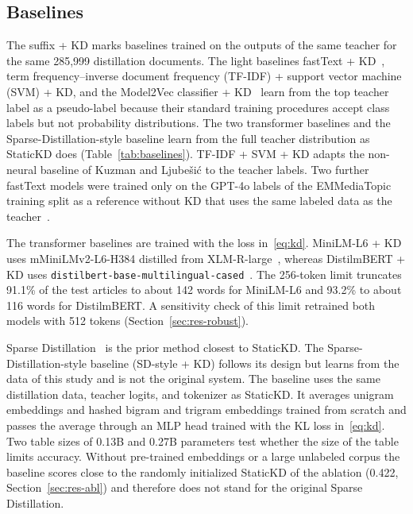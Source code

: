 \documentclass{ieeeaccess}
\begin{document}
\subsection{Baselines}
\label{sec:baselines}
The suffix + KD marks baselines trained on the outputs of the same teacher for the same 285,999 distillation documents. The light baselines fastText + KD~\cite{joulin2017bag}, term frequency--inverse document frequency (TF-IDF) + support vector machine (SVM) + KD, and the Model2Vec classifier + KD~\cite{tulkens2024model2vec} learn from the top teacher label as a pseudo-label because their standard training procedures accept class labels but not probability distributions. The two transformer baselines and the Sparse-Distillation-style baseline learn from the full teacher distribution as StaticKD does (Table~\ref{tab:baselines}). TF-IDF + SVM + KD adapts the non-neural baseline of Kuzman and Ljube\v{s}i\'c to the teacher labels. Two further fastText models were trained only on the GPT-4o labels of the EMMediaTopic training split as a reference without KD that uses the same labeled data as the teacher~\cite{kuzman2025llm}.

The transformer baselines are trained with the loss in~\eqref{eq:kd}. MiniLM-L6 + KD uses mMiniLMv2-L6-H384 distilled from XLM-R-large~\cite{wang2021minilmv2}, whereas DistilmBERT + KD uses \texttt{distilbert-base-multilingual-cased}~\cite{sanh2019distilbert}. The 256-token limit truncates 91.1\% of the test articles to about 142 words for MiniLM-L6 and 93.2\% to about 116 words for DistilmBERT. A sensitivity check of this limit retrained both models with 512 tokens (Section~\ref{sec:res-robust}).

Sparse Distillation~\cite{ye2022sparse} is the prior method closest to StaticKD. The Sparse-Distillation-style baseline (SD-style + KD) follows its design but learns from the data of this study and is not the original system. The baseline uses the same distillation data, teacher logits, and tokenizer as StaticKD. It averages unigram embeddings and hashed bigram and trigram embeddings trained from scratch and passes the average through an MLP head trained with the KL loss in~\eqref{eq:kd}. Two table sizes of 0.13B and 0.27B parameters test whether the size of the table limits accuracy. Without pre-trained embeddings or a large unlabeled corpus the baseline scores close to the randomly initialized StaticKD of the ablation (0.422, Section~\ref{sec:res-abl}) and therefore does not stand for the original Sparse Distillation.
\end{document}
